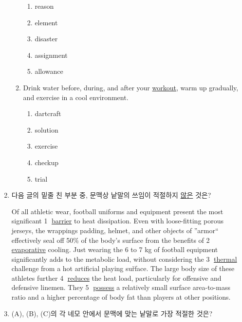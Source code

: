 \documentclass[a4wide,14pt]{extarticle}
\begin{document}
\begin{enumerate}[label=$\spadesuit$]
\begin{enumerate}[label={\textbf{\arabic*.}}, start=1]
		\begin{enumerate}[label={(\alph*)}]
			\item reason
			\item element
			\item disaster
			\item assignment
			\item allowance
		\end{enumerate}

		\item Drink water before, during, and after your \underline{workout}, warm up gradually, and exercise in a cool environment.

		\begin{enumerate}[label={(\alph*)}]
			\item dartcraft
			\item solution
			\item exercise
			\item checkup
			\item trial
		\end{enumerate}

	\end{enumerate}

\newpage

\item 다음 글의 밑줄 친 부분 중, 문맥상 낱말의 쓰임이 적절하지 \underline{않은} 것은?

\begin{tcolorbox}
	Of all athletic wear, football uniforms and equipment present the most significant
	\textcircled{1} \underline{barrier} to heat dissipation. Even with loose-fitting porous jerseys, the wrappings padding, helmet, and other objects of ''armor`` effectively seal off 50\% of the body's surface from the benefits of \textcircled{2} \underline{evaporative}	cooling. Just wearing the 6 to 7 kg of football equipment significantly adds to the metabolic load, without considering the \textcircled{3}	\underline{thermal} challenge from a hot artificial playing suřface. The large body size of these athletes further \textcircled{4} \underline{reduces} the heat load, particularly for offensive and defensive	linemen. They \textcircled{5} \underline{possess} a relatively small surface area-to-mass ratio and a higher	percentage of body fat than players at other positions.


\end{tcolorbox}


\newpage

\item (A), (B), (C)의 각 네모 안에서 문맥에 맞는 낱말로 가장 적절한 것은?


\end{enumerate}
\end{document}
